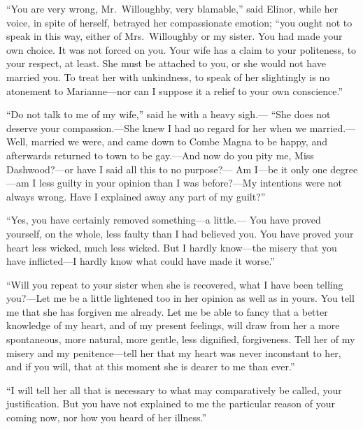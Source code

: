 \documentclass{article}
\begin{document}
``You are very wrong, Mr.\ Willoughby, very blamable,''
said Elinor, while her voice, in spite of herself,
betrayed her compassionate emotion; ``you ought not to speak
in this way, either of Mrs.\ Willoughby or my sister.
You had made your own choice.  It was not forced on you.
Your wife has a claim to your politeness, to your respect,
at least.  She must be attached to you, or she would not
have married you.  To treat her with unkindness, to speak
of her slightingly is no atonement to Marianne---nor can I
suppose it a relief to your own conscience.''

``Do not talk to me of my wife,'' said he with a heavy sigh.---%
``She does not deserve your compassion.---She knew I had no
regard for her when we married.---Well, married we were,
and came down to Combe Magna to be happy, and afterwards
returned to town to be gay.---And now do you pity me,
Miss Dashwood?---or have I said all this to no purpose?---%
Am I---be it only one degree---am I less guilty in your opinion
than I was before?---My intentions were not always wrong.
Have I explained away any part of my guilt?''

``Yes, you have certainly removed something---a little.---%
You have proved yourself, on the whole, less faulty than
I had believed you.  You have proved your heart less wicked,
much less wicked.  But I hardly know---the misery that
you have inflicted---I hardly know what could have made
it worse.''

``Will you repeat to your sister when she is recovered,
what I have been telling you?---Let me be a little lightened
too in her opinion as well as in yours.  You tell me that
she has forgiven me already.  Let me be able to fancy that
a better knowledge of my heart, and of my present feelings,
will draw from her a more spontaneous, more natural, more
gentle, less dignified, forgiveness.  Tell her of my misery
and my penitence---tell her that my heart was never inconstant
to her, and if you will, that at this moment she is dearer
to me than ever.''

``I will tell her all that is necessary to what may
comparatively be called, your justification.  But you have
not explained to me the particular reason of your coming now,
nor how you heard of her illness.''
\end{document}
